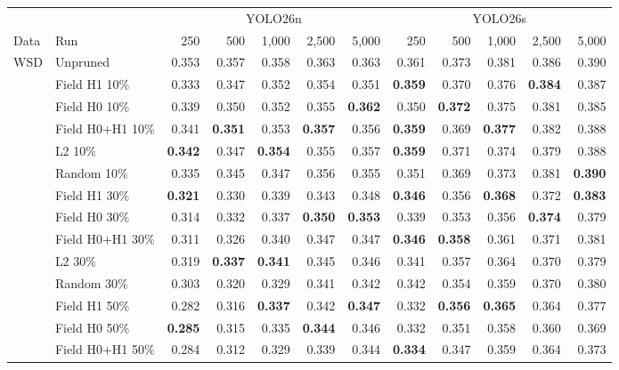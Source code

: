 \begin{tabular}{llrrrrrrrrrr}
\toprule
 & & \multicolumn{5}{c}{YOLO26n} & \multicolumn{5}{c}{YOLO26s} \\
\cmidrule(lr){3-7}\cmidrule(lr){8-12}
Data & Run & 250 & 500 & 1,000 & 2,500 & 5,000 & 250 & 500 & 1,000 & 2,500 & 5,000 \\
\midrule
WSD & Unpruned & 0.353 & 0.357 & 0.358 & 0.363 & 0.363 & 0.361 & 0.373 & 0.381 & 0.386 & 0.390 \\
 & Field H1 10\% & 0.333 & 0.347 & 0.352 & 0.354 & 0.351 & \textbf{0.359} & 0.370 & 0.376 & \textbf{0.384} & 0.387 \\
 & Field H0 10\% & 0.339 & 0.350 & 0.352 & 0.355 & \textbf{0.362} & 0.350 & \textbf{0.372} & 0.375 & 0.381 & 0.385 \\
 & Field H0+H1 10\% & 0.341 & \textbf{0.351} & 0.353 & \textbf{0.357} & 0.356 & \textbf{0.359} & 0.369 & \textbf{0.377} & 0.382 & 0.388 \\
 & L2 10\% & \textbf{0.342} & 0.347 & \textbf{0.354} & 0.355 & 0.357 & \textbf{0.359} & 0.371 & 0.374 & 0.379 & 0.388 \\
 & Random 10\% & 0.335 & 0.345 & 0.347 & 0.356 & 0.355 & 0.351 & 0.369 & 0.373 & 0.381 & \textbf{0.390} \\
\addlinespace[2pt]
 & Field H1 30\% & \textbf{0.321} & 0.330 & 0.339 & 0.343 & 0.348 & \textbf{0.346} & 0.356 & \textbf{0.368} & 0.372 & \textbf{0.383} \\
 & Field H0 30\% & 0.314 & 0.332 & 0.337 & \textbf{0.350} & \textbf{0.353} & 0.339 & 0.353 & 0.356 & \textbf{0.374} & 0.379 \\
 & Field H0+H1 30\% & 0.311 & 0.326 & 0.340 & 0.347 & 0.347 & \textbf{0.346} & \textbf{0.358} & 0.361 & 0.371 & 0.381 \\
 & L2 30\% & 0.319 & \textbf{0.337} & \textbf{0.341} & 0.345 & 0.346 & 0.341 & 0.357 & 0.364 & 0.370 & 0.379 \\
 & Random 30\% & 0.303 & 0.320 & 0.329 & 0.341 & 0.342 & 0.342 & 0.354 & 0.359 & 0.370 & 0.380 \\
\addlinespace[2pt]
 & Field H1 50\% & 0.282 & 0.316 & \textbf{0.337} & 0.342 & \textbf{0.347} & 0.332 & \textbf{0.356} & \textbf{0.365} & 0.364 & 0.377 \\
 & Field H0 50\% & \textbf{0.285} & 0.315 & 0.335 & \textbf{0.344} & 0.346 & 0.332 & 0.351 & 0.358 & 0.360 & 0.369 \\
 & Field H0+H1 50\% & 0.284 & 0.312 & 0.329 & 0.339 & 0.344 & \textbf{0.334} & 0.347 & 0.359 & 0.364 & 0.373 \\

\end{tabular}
